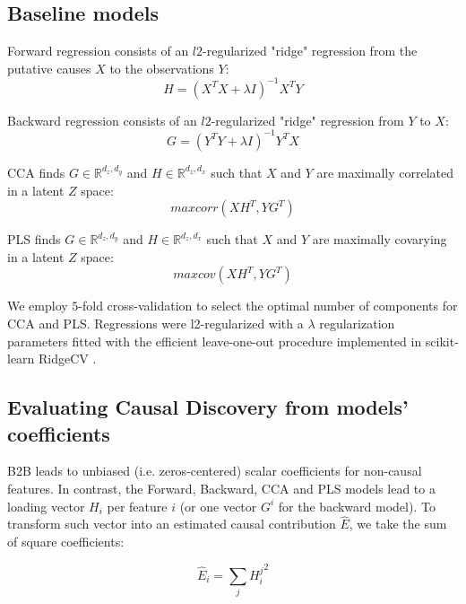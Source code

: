 \subsection{Baseline models}

Forward regression consists of an $l2$-regularized "ridge" regression from the putative causes $X$ to the observations $Y$:
\begin{equation}
  H = (X^T X +\lambda I)^{-1} X^T Y
\end{equation}

Backward regression consists of an $l2$-regularized "ridge" regression from $Y$ to $X$:
\begin{equation}
  G = (Y^T Y +\lambda I)^{-1} Y^T X
\end{equation}

CCA finds $G\in\mathbb{R}^{d_z, d_y}$ and $H\in\mathbb{R}^{d_z, d_x}$ such that $X$ and $Y$ are maximally correlated in a latent $Z$ space:
\begin{equation}
  max corr(XH^T, YG^T)
\end{equation}

PLS finds $G\in\mathbb{R}^{d_z, d_y}$ and $H\in\mathbb{R}^{d_z, d_x}$ such that $X$ and $Y$ are maximally covarying in a latent $Z$ space:
\begin{equation}
  max cov(XH^T, YG^T)
\end{equation}

We employ $5$-fold cross-validation to select the optimal number of components for CCA and PLS. Regressions were l2-regularized with a $\lambda$ regularization parameters fitted with the efficient leave-one-out procedure implemented in scikit-learn RidgeCV \citep{scikit}.

\subsection{Evaluating Causal Discovery from models' coefficients}

B2B leads to unbiased (i.e. zeros-centered) scalar coefficients for non-causal features. In contrast, the Forward, Backward, CCA and PLS models lead to a loading vector $H_i$ per feature $i$ (or one vector $G^i$ for the backward model). To transform such vector into an estimated causal contribution $\hat E$, we take the sum of square coefficients:

\begin{equation}
  \hat E_i = \sum_j {H^j_i}^2
\end{equation}

